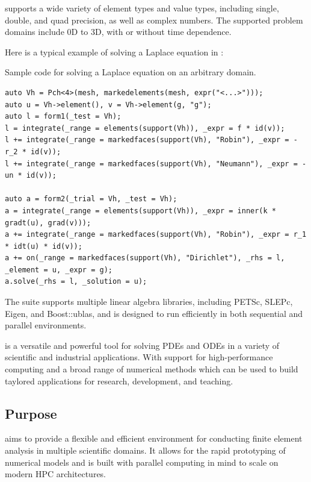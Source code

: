 \Feelpp supports a wide variety of element types and value types, including single, double, and quad precision, as well as complex numbers. The supported problem domains include 0D to 3D, with or without time dependence.

Here is a typical example of solving a Laplace equation in \Feelpp:

\begin{listing}[ht]
        \caption{Sample \Feelpp code for solving a Laplace equation on an arbitrary domain.}
\begin{verbatim}
auto Vh = Pch<4>(mesh, markedelements(mesh, expr("<...>")));
auto u = Vh->element(), v = Vh->element(g, "g");
auto l = form1(_test = Vh);
l = integrate(_range = elements(support(Vh)), _expr = f * id(v));
l += integrate(_range = markedfaces(support(Vh), "Robin"), _expr = -r_2 * id(v));
l += integrate(_range = markedfaces(support(Vh), "Neumann"), _expr = -un * id(v));

auto a = form2(_trial = Vh, _test = Vh);
a = integrate(_range = elements(support(Vh)), _expr = inner(k * gradt(u), grad(v)));
a += integrate(_range = markedfaces(support(Vh), "Robin"), _expr = r_1 * idt(u) * id(v));
a += on(_range = markedfaces(support(Vh), "Dirichlet"), _rhs = l, _element = u, _expr = g);
a.solve(_rhs = l, _solution = u);
\end{verbatim}
\end{listing}

The suite supports multiple linear algebra libraries, including PETSc, SLEPc, Eigen, and Boost::ublas, and is designed to run efficiently in both sequential and parallel environments.



\Feelpp is a versatile and powerful tool for solving PDEs and ODEs in a variety of scientific and industrial applications.
With support for high-performance computing and a broad range of numerical methods which can be used to build taylored applications for research, development, and teaching.


\subsection{Purpose}
\label{sec:Feelpp:purpose}
\Feelpp aims to provide a flexible and efficient environment for conducting finite element analysis in multiple scientific domains.
It allows for the rapid prototyping of numerical models and is built with parallel computing in mind to scale on modern HPC architectures.

